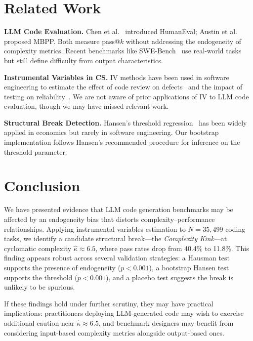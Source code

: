 \documentclass[conference]{IEEEtran}
\begin{document}
\section{Related Work}

\textbf{LLM Code Evaluation.} Chen et al.~\cite{chen2021evaluating} introduced HumanEval; Austin et al.~\cite{austin2021program} proposed MBPP. Both measure pass@$k$ without addressing the endogeneity of complexity metrics. Recent benchmarks like SWE-Bench~\cite{jimenez2023swebench} use real-world tasks but still define difficulty from output characteristics.

\textbf{Instrumental Variables in CS.} IV methods have been used in software engineering to estimate the effect of code review on defects~\cite{mcintosh2016empirical} and the impact of testing on reliability~\cite{mockus2009organizational}. We are not aware of prior applications of IV to LLM code evaluation, though we may have missed relevant work.

\textbf{Structural Break Detection.} Hansen's threshold regression~\cite{hansen2000sample} has been widely applied in economics but rarely in software engineering. Our bootstrap implementation follows Hansen's recommended procedure for inference on the threshold parameter.

\section{Conclusion}

We have presented evidence that LLM code generation benchmarks may be affected by an endogeneity bias that distorts complexity--performance relationships. Applying instrumental variables estimation to $N = 35{,}499$ coding tasks, we identify a candidate structural break---the \emph{Complexity Kink}---at cyclomatic complexity $\hat{\kappa} \approx 6.5$, where pass rates drop from 40.4\% to 11.8\%. This finding appears robust across several validation strategies: a Hausman test supports the presence of endogeneity ($p < 0.001$), a bootstrap Hansen test supports the threshold ($p < 0.001$), and a placebo test suggests the break is unlikely to be spurious.

If these findings hold under further scrutiny, they may have practical implications: practitioners deploying LLM-generated code may wish to exercise additional caution near $\hat{\kappa} \approx 6.5$, and benchmark designers may benefit from considering input-based complexity metrics alongside output-based ones.
\end{document}
